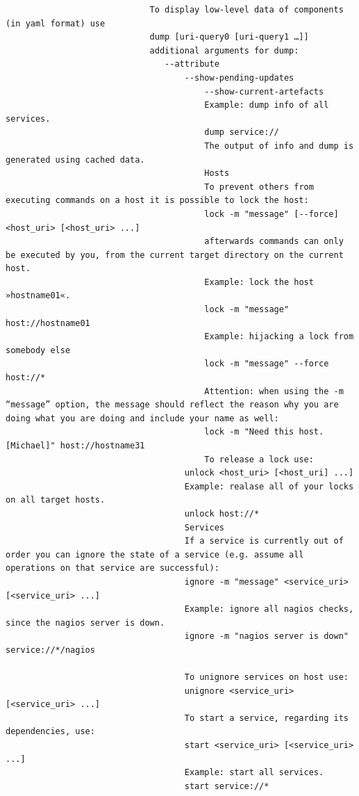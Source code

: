 \documentclass[10pt,landscape]{article}
\begin{document}
\begin{multicols}{3}
\begin{verbatim}
                             To display low-level data of components (in yaml format) use
                             dump [uri-query0 [uri-query1 …]] 
                             additional arguments for dump:
                                --attribute
                                    --show-pending-updates
                                        --show-current-artefacts
                                        Example: dump info of all services.
                                        dump service://
                                        The output of info and dump is generated using cached data.
                                        Hosts
                                        To prevent others from executing commands on a host it is possible to lock the host:
                                        lock -m "message" [--force] <host_uri> [<host_uri> ...]
                                        afterwards commands can only be executed by you, from the current target directory on the current host.
                                        Example: lock the host »hostname01«.
                                        lock -m "message" host://hostname01
                                        Example: hijacking a lock from somebody else
                                        lock -m "message" --force host://*
                                        Attention: when using the -m “message” option, the message should reflect the reason why you are doing what you are doing and include your name as well:
                                        lock -m "Need this host. [Michael]" host://hostname31
                                        To release a lock use:
                                    unlock <host_uri> [<host_uri] ...]
                                    Example: realase all of your locks on all target hosts.
                                    unlock host://*
                                    Services
                                    If a service is currently out of order you can ignore the state of a service (e.g. assume all operations on that service are successful):
                                    ignore -m "message" <service_uri> [<service_uri> ...]
                                    Example: ignore all nagios checks, since the nagios server is down.
                                    ignore -m "nagios server is down" service://*/nagios

                                    To unignore services on host use:
                                    unignore <service_uri> [<service_uri> ...]
                                    To start a service, regarding its dependencies, use:
                                    start <service_uri> [<service_uri> ...]
                                    Example: start all services.
                                    start service://*


\end{verbatim}
\end{multicols}
\end{document}
